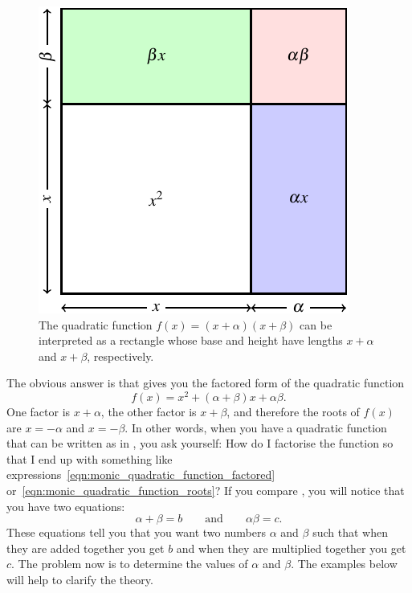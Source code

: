 \documentclass[a4paper,oneside,12pt]{article}
\begin{document}
\begin{figure}[!htbp]
\centering
\includegraphics[scale=1.1]{image/08/quadratic-as-square.pdf}
\caption{%
  The quadratic function $f(x) = (x + \alpha)(x + \beta)$ can be
  interpreted as a rectangle whose base and height have lengths
  $x + \alpha$ and $x + \beta$, respectively.
}
\label{fig:quadratic_as_rectangle}
\end{figure}

The obvious answer is that
 gives you the
factored form of the quadratic function
\begin{equation}
\label{eqn:monic_quadratic_function_roots}
f(x)
=
x^2 + (\alpha + \beta)x + \alpha\beta.
\end{equation}
One factor is $x + \alpha$, the other factor is $x + \beta$, and
therefore the roots of $f(x)$ are $x = -\alpha$ and $x = -\beta$.  In
other words, when you have a quadratic function that can be written as
in , you ask yourself: How do
I factorise the function so that I end up with something like
expressions~\eqref{eqn:monic_quadratic_function_factored}
or~\eqref{eqn:monic_quadratic_function_roots}?  If you compare
,
you will notice that you have two equations:
\begin{equation}
\label{eqn:monic_quadratic_function_factors_sum_product}
\alpha + \beta
=
b
\qquad
\text{and}
\qquad
\alpha\beta
=
c.
\end{equation}
These equations tell you that you want two numbers $\alpha$ and
$\beta$ such that when they are added together you get $b$ and when
they are multiplied together you get $c$.  The problem now is to
determine the values of $\alpha$ and $\beta$.  The examples below will
help to clarify the theory.
\end{document}
